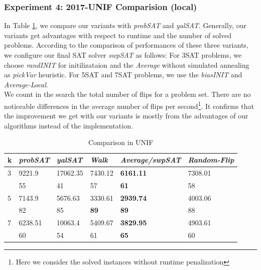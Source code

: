 \documentclass[12pt,a4paper,twoside]{scrartcl}
\numberwithin{equation}{section}
\begin{document}
\subsubsection{Experiment 4: 2017-UNIF Comparision (local)} 
\label{sec:Experiment 4}
In Table \ref{tab:UNIF}, we compare our variants with \emph{probSAT} and \emph{yalSAT}. Generally, our variants get advantages with respect to runtime and the number of solved problems.
According to the comparison of performances of these three variants,  we configure our final SAT solver \emph{swpSAT} as follows: For 3SAT problems, we choose \emph{randINIT} for initilizataion and the \emph{Average} without simulated annealing as \emph{pickVar} heuristic. For 5SAT and 7SAT problems, we use the \emph{biasINIT} and \emph{Average-Local}.  \\
We count in the search the total number of flips for a problem set. There are no noticeable differences in the average number of flips per second\footnote{Here we consider the solved instances without runtime penalization}. It confirms that the improvement we get with our variants is mostly from the advantages of our algorithms instead of the implementation.
   \begin{table}[H]
   \label{tab:UNIF}
\begin{center}
    \begin{tabular}{|l|l|l|l|l|p{3cm}|}
\hline 

    k &\emph{probSAT}&\emph{yalSAT}&\emph{Walk}&\emph{Average/swpSAT}&\emph{Random-Flip} \\ \hline      
    3 &9221.9&17062.35&7430.12&\textbf{6161.11} &7308.01\\ 
    &55&41&57&\textbf{61}&58\\ \hline
    5& 7143.9&5676.63&3330.61&\textbf{2939.74}&4003.06\\ 
    &82&85&\textbf{89}&\textbf{89}&88\\ \hline
    7& 6238.51&10063.4&5409.67&\textbf{3829.95}&4903.61\\
    &60&54&61&\textbf{65}&60\\ \hline
	
\end{tabular}
\end{center}
\caption{Comparison in UNIF}
\end{table}
\end{document}
